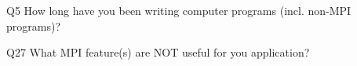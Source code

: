 \begin{description}%
\item{Q5} How long have you been writing computer programs (incl. non-MPI programs)?%
\item{Q27} What MPI feature(s) are NOT useful for you application?%
\end{description}%
